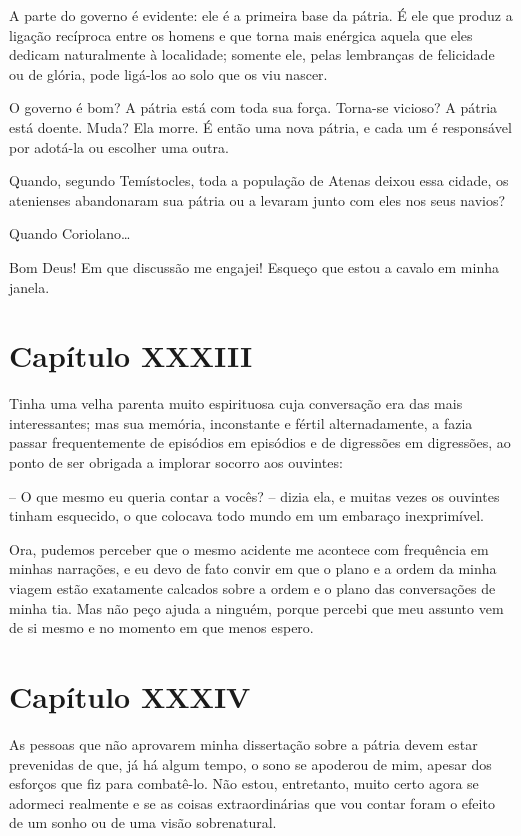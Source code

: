  A parte do governo é evidente: ele é a primeira base da pátria. É ele
que produz a ligação recíproca entre os homens e que torna mais
enérgica aquela que eles dedicam naturalmente à localidade; somente
ele, pelas lembranças de felicidade ou de glória, pode ligá-los ao solo
que os viu nascer.

 O governo é bom? A pátria está com toda sua força. Torna-se vicioso? A
pátria está doente. Muda? Ela morre. É então uma nova pátria, e cada um
é responsável por adotá-la ou escolher uma outra.

 Quando, segundo Temístocles, toda a população de Atenas deixou essa
cidade, os atenienses abandonaram sua pátria ou a levaram junto com
eles nos seus navios?

 Quando Coriolano\ldots

 Bom Deus! Em que discussão me engajei! Esqueço que estou a cavalo em
minha janela.

\section*{Capítulo XXXIII}

 Tinha uma velha parenta muito espirituosa cuja conversação era das mais
interessantes; mas sua memória, inconstante e fértil alternadamente, a
fazia passar frequentemente de episódios em episódios e de digressões
em digressões, ao ponto de ser obrigada a implorar socorro aos
ouvintes:

 -- O que mesmo eu queria contar a vocês? -- dizia ela, e muitas vezes os
ouvintes tinham esquecido, o que colocava todo mundo em um embaraço
inexprimível.

 Ora, pudemos perceber que o mesmo acidente me acontece com frequência
em minhas narrações, e eu devo de fato convir em que o plano e a ordem
da minha viagem estão exatamente calcados sobre a ordem e o plano das
conversações de minha tia. Mas não peço ajuda a ninguém, porque percebi
que meu assunto vem de si mesmo e no momento em que menos espero.

\section*{Capítulo XXXIV}

 As pessoas que não aprovarem minha dissertação sobre a pátria devem
estar prevenidas de que, já há algum tempo, o sono se apoderou de mim,
apesar dos esforços que fiz para combatê-lo. Não estou, entretanto,
muito certo agora se adormeci realmente e se as coisas extraordinárias
que vou contar foram o efeito de um sonho ou de uma visão sobrenatural.

